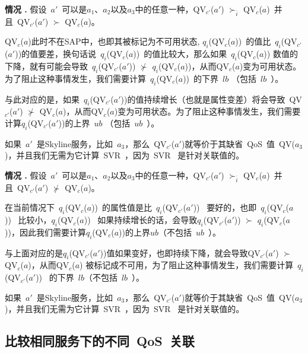 \vspace{2pt}
\textbf{情况 \uppercase\expandafter{}.} 假设~$a'$~可以是$a_{1}$、$a_{2}$以及$a_{3}$中的任意一种，QV$_{c'}$($a'$) $\succ_{\overline{i}}$ QV$_{c}$($a$)~并且~QV$_{c'}$($a'$) $\succ$ QV$_{c}$($a$)。
\vspace{2pt}

QV$_{c}$($a$)此时不在SAP中，也即其被标记为不可用状态, $q_{i}$(QV$_{c}$($a$))~的值比~$q_{i}$(QV$_{c'}$($a'$))的值要差，换句话说~$q_{i}$(QV$_{c}$($a$))~的值比较大，那么如果~$q_{i}$(QV$_{c}$($a$)) 数值的下降，就有可能会导致~$q_{i}$(QV$_{c'}$($a'$)) $\nsucc$ $q_{i}$(QV$_{c}$($a$))，从而QV$_{c}$($a$)变为可用状态。为了阻止这种事情发生，我们需要计算~$q_{i}$(QV$_{c}$($a$))~的下界~$lb$ （包括~$lb$~）。

与此对应的是，如果~$q_{i}$(QV$_{c'}$($a'$))的值持续增长（也就是属性变差）将会导致~QV$_{c'}$($a'$) $\nsucc$ QV$_{c}$($a$)，从而QV$_{c}$($a$)变为可用状态。为了阻止这种事情发生，我们需要计算$q_{i}$(QV$_{c'}$($a'$))的上界~$ub$ （包括~$ub$~）。

如果~$a'$~是Skyline服务，比如~$a_{3}$，那么~QV$_{c'}$($a'$)就等价于其缺省~QoS~值~QV($a_{3}$)，并且我们无需为它计算~SVR~，因为~SVR~ 是针对关联值的。

\vspace{2pt}
\textbf{情况 \uppercase\expandafter{}.} 假设~$a'$~可以是$a_{1}$、$a_{2}$以及$a_{3}$中的任意一种，QV$_{c'}$($a'$) $\succ_{\overline{i}}$ QV$_{c}$($a$)~并且~QV$_{c'}$($a'$) $\nsucc$ QV$_{c}$($a$)。
\vspace{2pt}

在当前情况下~$q_{i}$(QV$_{c}$($a$))~的属性值是比~$q_{i}$(QV$_{c'}$($a'$))~ 要好的，也即~$q_{i}$(QV$_{c}$($a$))~ 比较小，$q_{i}$(QV$_{c}$($a$))~ 如果持续增长的话，会导致$q_{i}$(QV$_{c'}$($a'$)) $\succ$ $q_{i}$(QV$_{c}$($a$))，因此我们需要计算$q_{i}$(QV$_{c}$($a$))的上界$ub$（不包括~$ub$~）。

与上面对应的是$q_{i}$(QV$_{c'}$($a'$))值如果变好，也即持续下降，就会导致QV$_{c'}$($a'$) $\succ$ QV$_{c}$($a$)，从而QV$_{c}$($a$) 被标记成不可用，为了阻止这种事情发生，我们需要计算~$q_{i}$(QV$_{c'}$($a'$))~ 的下界~$lb$（不包括~$lb$~）。

如果~$a'$~是Skyline服务，比如~$a_{3}$，那么~QV$_{c'}$($a'$)就等价于其缺省~QoS~值~QV($a_{3}$)，并且我们无需为它计算~SVR~，因为~SVR~ 是针对关联值的。

\subsection{比较相同服务下的不同~QoS~关联}

